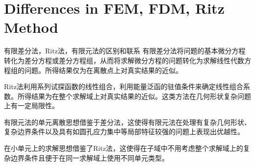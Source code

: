 \documentclass[11pt]{beamer}
\begin{document}
\section{Differences in FEM, FDM, Ritz Method}
\begin{frame}
\begin{block}{有限差分法，Ritz法，有限元法的区别和联系}
有限差分法将问题的基本微分方程转化为差分方程或差分方程组，从而将求解微分方程的问题转化为求解线性代数方程组的问题。所得结果仅为在离散点上对真实结果的近似。

Ritz法利用系列试探函数的线性组合，利用能量泛函的驻值条件来确定线性组合系数。所得结果为在整个求解域上对真实结果的近似。这类方法在几何形状复杂问题上有一定局限性。

有限元法的单元离散思想借鉴于差分法，这使得有限元法在处理有复杂几何形状、复杂边界条件以及具有如圆孔应力集中等局部特征较强的问题上表现出优越性。

在小单元上的求解思想借鉴了Ritz法，这使得在子域中不用考虑整个求解域上的复杂边界条件且便于在同一求解域上使用不同单元类型。
\end{block}
\end{frame}
%
%
%
\end{document}
